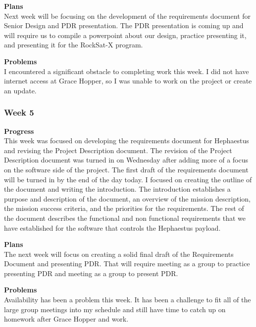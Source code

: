 \textbf{Plans} \\
Next week will be focusing on the development of the requirements document for Senior Design and PDR presentation. The PDR presentation is coming up and will require us to compile a powerpoint about our design, practice presenting it, and presenting it for the RockSat-X program.

\textbf{Problems} \\
I encountered a significant obstacle to completing work this week. I did not have internet access at Grace Hopper, so I was unable to work on the project or create an update.

\subsubsection{Week 5}
\textbf{Progress} \\
This week was focused on developing the requirements document for Hephaestus and revising the Project Description document. The revision of the Project Description document was turned in on Wednesday after adding more of a focus on the software side of the project. The first draft of the requirements document will be turned in by the end of the day today. I focused on creating the outline of the document and writing the introduction. The introduction establishes a purpose and description of the document, an overview of the mission description, the mission success criteria, and the priorities for the requirements. The rest of the document describes the functional and non functional requirements that we have established for the software that controls the Hephaestus payload.

\textbf{Plans} \\
The next week will focus on creating a solid final draft of the Requirements Document and presenting PDR. That will require meeting as a group to practice presenting PDR and meeting as a group to present PDR.

\textbf{Problems} \\
Availability has been a problem this week. It has been a challenge to fit all of the large group meetings into my schedule and still have time to catch up on homework after Grace Hopper and work.

